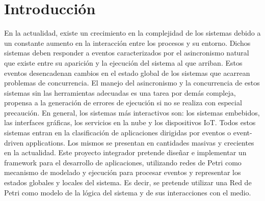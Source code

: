 \section{Introducción}
En la actualidad, existe un crecimiento en la complejidad de los sistemas
debido a un constante aumento en la interacción entre los procesos y su
entorno. Dichos sistemas deben responder a eventos caracterizados por el
asincronismo natural que existe entre su aparición y la ejecución del sistema
al que arriban. Estos eventos desencadenan cambios en el estado global de los
sistemas que acarrean problemas de concurrencia.
El manejo del asincronismo y la concurrencia de estos sistemas sin las
herramientas adecuadas es una tarea por demás compleja, propensa a la
generación de errores de ejecución si no se realiza con especial precaución.
En general, los sistemas más interactivos son: los sistemas embebidos, las
interfaces gráficas, los servicios en la nube y los dispositivos IoT. Todos
estos sistemas entran en la clasificación de aplicaciones dirigidas por eventos
o event-driven applications.\cite{chimp} Los mismos se presentan en
cantidades masivas y crecientes en la actualidad.
Este proyecto integrador pretende diseñar e implementar un framework para el
desarrollo de aplicaciones, utilizando redes de Petri como mecanismo de
modelado y ejecución para procesar eventos y representar los estados globales y
locales del sistema. Es decir, se pretende utilizar una Red de Petri como
modelo de la lógica del sistema y de sus interacciones con el medio.

